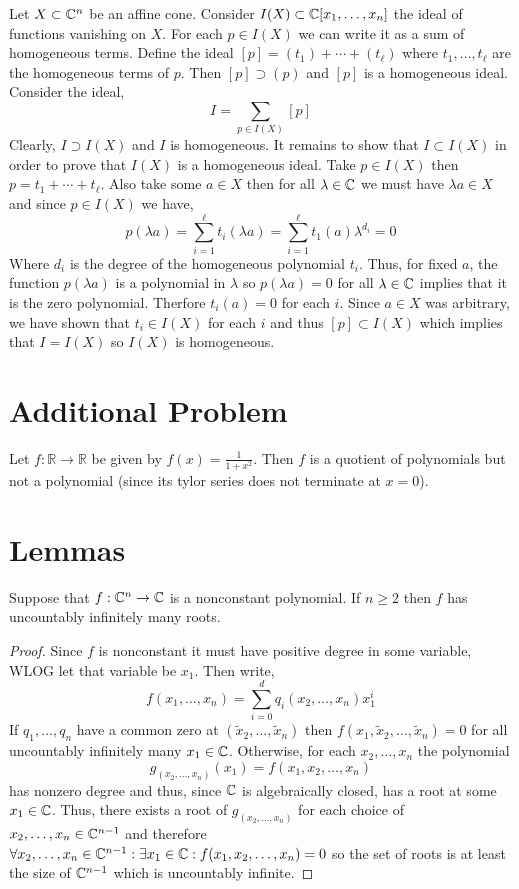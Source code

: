 \documentclass[12pt]{article}
\begin{document}
Let $X \subset \mathbb{C}^n$ be an affine cone. Consider $I(X) \subset \mathbb{C}[x_1, \dots, x_n]$ the ideal of functions vanishing on $X$. For each $p \in I(X)$ we can write it as a sum of homogeneous terms. Define the ideal $[p] = (t_1) + \cdots + (t_\ell)$ where $t_1, \dots, t_\ell$ are the homogeneous terms of $p$. Then $[p] \supset (p)$ and $[p]$ is a homogeneous ideal. Consider the ideal,
\[ I = \sum_{p \in I(X)} [p] \]
Clearly, $I \supset I(X)$ and $I$ is homogeneous. It remains to show that $I \subset I(X)$ in order to prove that $I(X)$ is a homogeneous ideal. Take $p \in I(X)$ then $p = t_1 + \cdots + t_\ell$. Also take some $a \in X$ then for all $\lambda \in \mathbb{C}$ we must have $\lambda a \in X$ and since $p \in I(X)$ we have,
\[ p(\lambda a) = \sum_{i = 1}^\ell t_i(\lambda a) = \sum_{i = 1}^\ell t_1(a) \lambda^{d_i} = 0 \]
Where $d_i$ is the degree of the homogeneous polynomial $t_i$. Thus, for fixed $a$, the function $p(\lambda a)$ is a polynomial in $\lambda$ so $p(\lambda a) = 0$ for all $\lambda \in \mathbb{C}$ implies that it is the zero polynomial. Therfore $t_i(a) = 0$ for each $i$. Since $a \in X$ was arbitrary, we have shown that $t_i \in I(X)$ for each $i$ and thus $[p] \subset I(X)$ which implies that $I = I(X)$ so $I(X)$ is homogeneous.  

\section{Additional Problem}

\newcommand{\R}{\mathbb{R}}

Let $f : \R \to \R$ be given by $f(x) = \frac{1}{1 + x^2}$. Then $f$ is a quotient of polynomials but not a polynomial (since its tylor series does not terminate at $x = 0$). 

\section{Lemmas}

\begin{lemma} \label{poly_num_zeros}
Suppose that $f : \mathbb{C}^n \to \mathbb{C}$ is a nonconstant polynomial. If $n \ge 2$ then $f$ has uncountably infinitely many roots.
\end{lemma}

\begin{proof}
Since $f$ is nonconstant it must have positive degree in some variable, WLOG let that variable be $x_1$. Then write,
\[ f(x_1, \dots, x_n) = \sum_{i = 0}^d q_i(x_2, \dots, x_n) x_1^i \]
If $q_1, \dots, q_n$ have a common zero at $(\tilde{x}_2, \dots, \tilde{x}_n)$ then $f(x_1, \tilde{x}_2, \dots, \tilde{x}_n) = 0$ for all uncountably infinitely many $x_1 \in \mathbb{C}$. Otherwise, for each $x_2, \dots, x_n$ the polynomial 
\[g_{(x_2, \dots, x_n)}(x_1) = f(x_1, x_2, \dots, x_n)\] has nonzero degree and thus, since $\mathbb{C}$ is algebraically closed, has a root at some $x_1 \in \mathbb{C}$. Thus, there exists a root of $g_{(x_2, \dots, x_n)}$ for each choice of $x_2, \dots, x_n \in \mathbb{C}^{n-1}$ and therefore $\forall x_2, \dots, x_n \in \mathbb{C}^{n-1} : \exists x_1 \in \mathbb{C} : f(x_1, x_2, \dots, x_n) = 0$ so the set of roots is at least the size of $\mathbb{C}^{n-1}$ which is uncountably infinite.
\end{proof}
\end{document}
